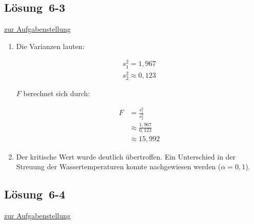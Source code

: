 \documentclass[
  11pt,
  ngerman,
  a4paper,
]{report}
\begin{document}
\hypertarget{loesung-6-3}{%
\subsection{Lösung~6-3}\label{loesung-6-3}}

\protect\hyperlink{aufgabe-6-3}{zur Aufgabenstellung}

\begin{enumerate}
\def\labelenumi{\alph{enumi})}
\item
  Die Varianzen lauten:

  \[\begin{aligned}
   s^2_1= 1{,}967\\
   s^2_2\approx 0{,}123
   \end{aligned}\]

  \(F\) berechnet sich durch:

  \[\begin{aligned}
   F&=\frac{s^2_1}{s^2_2}\\[6pt]
   &\approx\frac{1{,}967}{0{,}123}\\[4pt]
   &\approx15{,}992
   \end{aligned}\]
\item
  Der kritische Wert wurde deutlich übertroffen. Ein Unterschied in der Streuung der Wassertemperaturen konnte nachgewiesen werden (\(\alpha=0{,}1\)).
\end{enumerate}

\hypertarget{loesung-6-4}{%
\subsection{Lösung~6-4}\label{loesung-6-4}}

\protect\hyperlink{aufgabe-6-4}{zur Aufgabenstellung}
\end{document}
